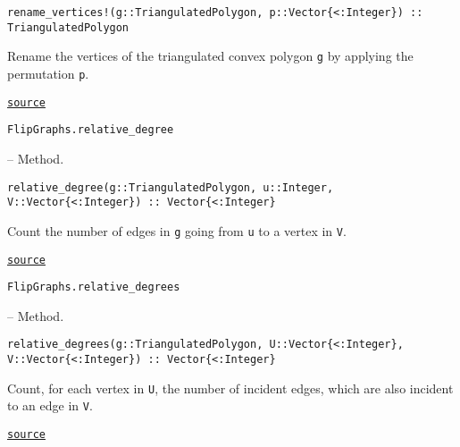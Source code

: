 \begin{adjustwidth}{2em}{0pt}


\begin{verbatim}
rename_vertices!(g::TriangulatedPolygon, p::Vector{<:Integer}) :: TriangulatedPolygon
\end{verbatim}

Rename the vertices of the triangulated convex polygon \texttt{g} by applying the permutation \texttt{p}.



\href{https://github.com/schto223/FlipGraphs.jl/blob/e35d43698a06b86273148826b79d585ba04fcd26/src/flipGraphPlanar.jl#L330-L334}{\texttt{source}}


\end{adjustwidth}
\hypertarget{2627864872710428840}{\texttt{FlipGraphs.relative\_degree}}  -- {Method.}

\begin{adjustwidth}{2em}{0pt}


\begin{verbatim}
relative_degree(g::TriangulatedPolygon, u::Integer, V::Vector{<:Integer}) :: Vector{<:Integer}
\end{verbatim}

Count the number of edges in \texttt{g} going from \texttt{u} to a vertex in \texttt{V}.



\href{https://github.com/schto223/FlipGraphs.jl/blob/e35d43698a06b86273148826b79d585ba04fcd26/src/flipGraphPlanar.jl#L395-L399}{\texttt{source}}


\end{adjustwidth}
\hypertarget{11363186084085056127}{\texttt{FlipGraphs.relative\_degrees}}  -- {Method.}

\begin{adjustwidth}{2em}{0pt}


\begin{verbatim}
relative_degrees(g::TriangulatedPolygon, U::Vector{<:Integer}, V::Vector{<:Integer}) :: Vector{<:Integer}
\end{verbatim}

Count, for each vertex in \texttt{U}, the number of incident edges, which are also incident to an edge in \texttt{V}.



\href{https://github.com/schto223/FlipGraphs.jl/blob/e35d43698a06b86273148826b79d585ba04fcd26/src/flipGraphPlanar.jl#L380-L384}{\texttt{source}}


\end{adjustwidth}

